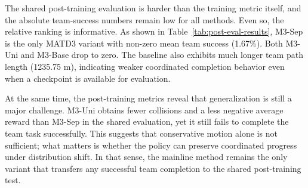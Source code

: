 \documentclass[a4paper,fleqn]{cas-dc}
\begin{document}
The shared post-training evaluation is harder than the training metric itself, and the absolute team-success numbers remain low for all methods. Even so, the relative ranking is informative. As shown in Table~\ref{tab:post-eval-results}, M3-Sep is the only MATD3 variant with non-zero mean team success (1.67\%). Both M3-Uni and M3-Base drop to zero. The baseline also exhibits much longer team path length (1235.75 m), indicating weaker coordinated completion behavior even when a checkpoint is available for evaluation.

At the same time, the post-training metrics reveal that generalization is still a major challenge. M3-Uni obtains fewer collisions and a less negative average reward than M3-Sep in the shared evaluation, yet it still fails to complete the team task successfully. This suggests that conservative motion alone is not sufficient; what matters is whether the policy can preserve coordinated progress under distribution shift. In that sense, the mainline method remains the only variant that transfers any successful team completion to the shared post-training test.

\begin{center}
\begin{minipage}{\columnwidth}
\label{tab:post-eval-results}
\centering
\scriptsize
\setlength{\tabcolsep}{2pt}
\end{minipage}
\end{center}
\end{document}
